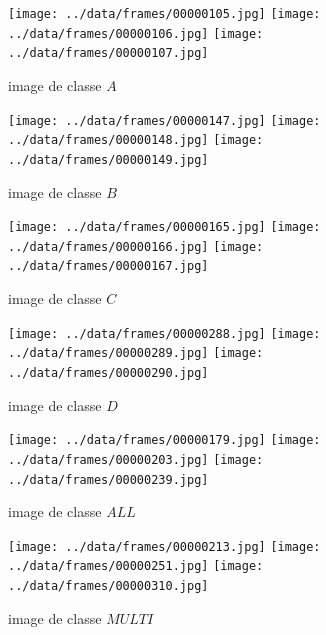 \documentclass{book}
\begin{document}
\begin{figure}[H]
\begin{center}
\texttt{[image: ../data/frames/00000105.jpg]}
\texttt{[image: ../data/frames/00000106.jpg]}
\texttt{[image: ../data/frames/00000107.jpg]}
\end{center}
\caption{image de classe $A$}
\label{classeA}
\end{figure}

\begin{figure}[H]
\begin{center}
\texttt{[image: ../data/frames/00000147.jpg]}
\texttt{[image: ../data/frames/00000148.jpg]}
\texttt{[image: ../data/frames/00000149.jpg]}
\end{center}
\caption{image de classe $B$}
\label{classeB}
\end{figure}

\begin{figure}[H]
\begin{center}
\texttt{[image: ../data/frames/00000165.jpg]}
\texttt{[image: ../data/frames/00000166.jpg]}
\texttt{[image: ../data/frames/00000167.jpg]}
\end{center}
\caption{image de classe $C$}
\label{classeC}
\end{figure}

\begin{figure}[H]
\begin{center}
\texttt{[image: ../data/frames/00000288.jpg]}
\texttt{[image: ../data/frames/00000289.jpg]}
\texttt{[image: ../data/frames/00000290.jpg]}
\end{center}
\caption{image de classe $D$}
\label{classeD}
\end{figure}

\begin{figure}[H]
\begin{center}
\texttt{[image: ../data/frames/00000179.jpg]}
\texttt{[image: ../data/frames/00000203.jpg]}
\texttt{[image: ../data/frames/00000239.jpg]}
\end{center}
\caption{image de classe $ALL$}
\label{classeALL}
\end{figure}

\begin{figure}[H]
\begin{center}
\texttt{[image: ../data/frames/00000213.jpg]}
\texttt{[image: ../data/frames/00000251.jpg]}
\texttt{[image: ../data/frames/00000310.jpg]}
\end{center}
\caption{image de classe $MULTI$}
\label{classeMULTI}
\end{figure}
\end{document}
